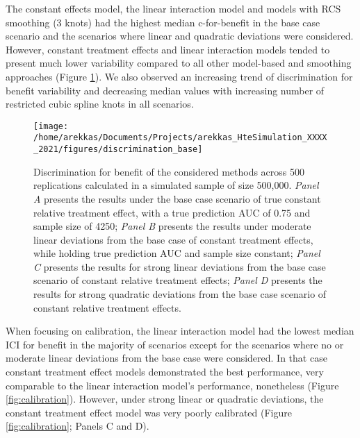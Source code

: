 \documentclass{article}
\begin{document}
The constant effects model, the linear interaction model and models with
RCS smoothing (3 knots) had the highest median c-for-benefit in the base
case scenario and the scenarios where linear and quadratic deviations
were considered. However, constant treatment effects and linear
interaction models tended to present much lower variability compared to
all other model-based and smoothing approaches (Figure
\ref{fig:discrimination}). We also observed an increasing trend of
discrimination for benefit variability and decreasing median values with
increasing number of restricted cubic spline knots in all scenarios.

\begin{figure}
\texttt{[image: /home/arekkas/Documents/Projects/arekkas\_HteSimulation\_XXXX\_2021/figures/discrimination\_base]} \caption{Discrimination for benefit of the considered methods across 500 replications calculated in a simulated sample of size 500,000. \textit{Panel A} presents the results under the base case scenario of true constant relative treatment effect, with a true prediction AUC of 0.75 and sample size of 4250; \textit{Panel B} presents the results under moderate linear deviations from the base case of constant treatment effects, while holding true prediction AUC and sample size constant; \textit{Panel C} presents the results for strong linear deviations from the base case scenario of constant relative treatment effects; \textit{Panel D} presents the results for strong quadratic deviations from the base case scenario of constant relative treatment effects.}\label{fig:discrimination}
\end{figure}

When focusing on calibration, the linear interaction model had the
lowest median ICI for benefit in the majority of scenarios except for
the scenarios where no or moderate linear deviations from the base case
were considered. In that case constant treatment effect models
demonstrated the best performance, very comparable to the linear
interaction model's performance, nonetheless (Figure
\ref{fig:calibration}). However, under strong linear or quadratic
deviations, the constant treatment effect model was very poorly
calibrated (Figure \ref{fig:calibration}; Panels C and D).
\end{document}
